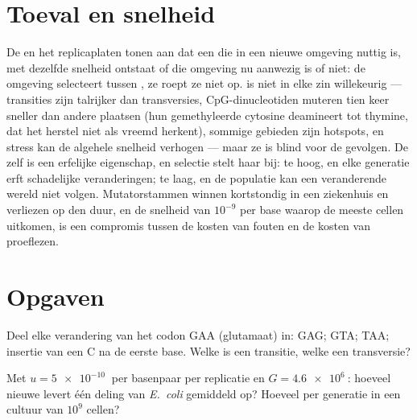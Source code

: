 \section{Toeval en snelheid}

\begin{proposition}\label{prop:b2:genome-diversification:random}
De  en het replicaplaten tonen aan dat een  die in
een nieuwe omgeving nuttig is, met dezelfde snelheid ontstaat of die
omgeving nu aanwezig is of niet: de omgeving selecteert tussen ,
ze roept ze niet op.  is niet in elke zin willekeurig ---
transities zijn talrijker dan transversies, CpG-dinucleotiden muteren tien
keer sneller dan andere plaatsen (hun gemethyleerde cytosine deamineert
tot thymine, dat het herstel niet als vreemd herkent), sommige gebieden
zijn hotspots, en stress kan de algehele snelheid verhogen --- maar ze
is blind voor de gevolgen. De  zelf is een erfelijke
eigenschap, en selectie stelt haar bij: te hoog, en elke generatie erft
schadelijke veranderingen; te laag, en de populatie kan een veranderende
wereld niet volgen. Mutatorstammen winnen kortstondig in een ziekenhuis
en verliezen op den duur, en de snelheid van $10^{-9}$ per base waarop
de meeste cellen uitkomen, is een compromis tussen de kosten van fouten
en de kosten van proeflezen.
\end{proposition}

\section{Opgaven}

\begin{exercise}[$\star$]\label{exo:b2:genome-diversification:1}
Deel elke verandering van het codon GAA (glutamaat) in: GAG; GTA; TAA;
insertie van een C na de eerste base. Welke is een transitie, welke een
transversie?
\end{exercise}

\begin{exercise}[$\star$]\label{exo:b2:genome-diversification:2}
Met $u = \qty{5e-10}{}$ per basenpaar per replicatie en $G =
\qty{4.6e6}{}$: hoeveel nieuwe  levert één deling van
\emph{E.~coli} gemiddeld op? Hoeveel per generatie in een cultuur van
$10^{9}$ cellen?
\end{exercise}

